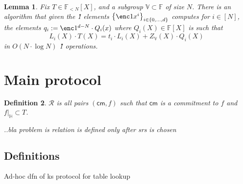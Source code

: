 \documentclass[11pt]{article} %
\newcommand{\F}{\ensuremath{\mathbb F}\xspace}
\newcommand{\cm}{\ensuremath{\mathsf{cm}}\xspace}
\newcommand{\defeq}{:=}
\newcommand{\sett}[2]{\ensuremath{\set{#1}_{#2}}\xspace}
\newcommand{\rel}{\ensuremath{\mathcal{R}}\xspace}
\newcommand{\set}[1]{\ensuremath{\left\{#1\right\}}\xspace}
\newcommand{\polysofdeg}[1]{\ensuremath{\F_{< #1}[X]}\xspace}
\newtheorem{lemma}{Lemma}[section]
\newtheorem{dfn}[lemma]{Definition}
\newcommand{\subspace}{\ensuremath{\mathbb{H}}\xspace}
\newcommand{\bigspace}{\ensuremath{\mathbb{V}}\xspace}
\newcommand{\tabsize}{\ensuremath{N}\xspace}
\begin{document}
\begin{lemma}
Fix $T\in \polysofdeg{\tabsize}$, and a subgroup $\bigspace\subset \F$ of size \tabsize. 
There is an algorithm that given the \G1 elements $\sett{\enc1{x^i}}{i\in \set{0,\ldots,d}}$ computes for $i\in [\tabsize]$, the elements 
$q_i\defeq \enc1{^{d-\tabsize}\cdot Q_i(x)}$
where $Q_i(X)\in \F[X]$ is such that
\[L_i(X)\cdot T(X)=t_i\cdot L_i(X) + Z_\bigspace(X)\cdot Q_i(X)\]
in $O(\tabsize\cdot \log \tabsize)$ \G1 operations.
 
\end{lemma}

\section{Main protocol}
\begin{dfn}\label{dfn:mainrelation}
 \rel is all pairs $(\cm,f)$
 such that \cm is a commitment to $f$ and $f|_\subspace \subset T$.
 
 ..bla  problem is relation is defined only after srs is chosen
\end{dfn}

\subsection{Definitions}

Ad-hoc dfn of ks protocol for table lookup
\end{document}

